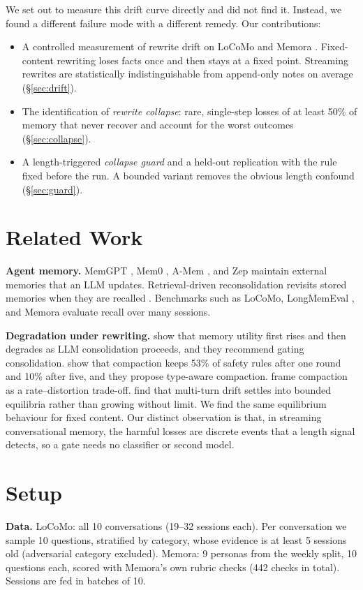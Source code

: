 \documentclass[11pt]{article}
\begin{document}
We set out to measure this drift curve directly and did not find it. Instead, we found a different failure mode with a different remedy. Our contributions:
\begin{itemize}
\item A controlled measurement of rewrite drift on LoCoMo \citep{maharana2024locomo} and Memora \citep{uddin2026memora}. Fixed-content rewriting loses facts once and then stays at a fixed point. Streaming rewrites are statistically indistinguishable from append-only notes on average (\S\ref{sec:drift}).
\item The identification of \emph{rewrite collapse}: rare, single-step losses of at least 50\% of memory that never recover and account for the worst outcomes (\S\ref{sec:collapse}).
\item A length-triggered \emph{collapse guard} and a held-out replication with the rule fixed before the run. A bounded variant removes the obvious length confound (\S\ref{sec:guard}).
\end{itemize}

\section{Related Work}
\textbf{Agent memory.} MemGPT \citep{packer2023memgpt}, Mem0 \citep{chhikara2025mem0}, A-Mem \citep{xu2025amem}, and Zep \citep{rasmussen2025zep} maintain external memories that an LLM updates. Retrieval-driven reconsolidation revisits stored memories when they are recalled \citep{song2026realm}. Benchmarks such as LoCoMo, LongMemEval \citep{wu2024longmemeval}, and Memora evaluate recall over many sessions.

\textbf{Degradation under rewriting.} \citet{zhang2026faulty} show that memory utility first rises and then degrades as LLM consolidation proceeds, and they recommend gating consolidation. \citet{zerhoudi2026cliff} show that compaction keeps 53\% of safety rules after one round and 10\% after five, and they propose type-aware compaction. \citet{colaco2026rd} frame compaction as a rate--distortion trade-off. \citet{dongre2025drift} find that multi-turn drift settles into bounded equilibria rather than growing without limit. We find the same equilibrium behaviour for fixed content. Our distinct observation is that, in streaming conversational memory, the harmful losses are discrete events that a length signal detects, so a gate needs no classifier or second model.

\section{Setup}
\textbf{Data.} LoCoMo: all 10 conversations (19--32 sessions each). Per conversation we sample 10 questions, stratified by category, whose evidence is at least 5 sessions old (adversarial category excluded). Memora: 9 personas from the weekly split, 10 questions each, scored with Memora's own rubric checks (442 checks in total). Sessions are fed in batches of 10.
\end{document}
